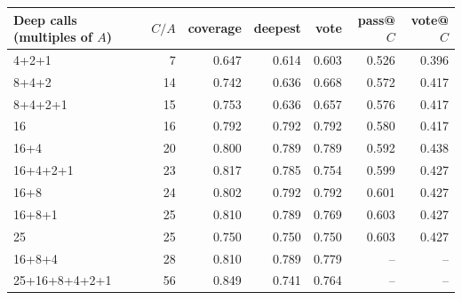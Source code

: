 \begin{tabular}{lrrrrrr}
\toprule
Deep calls (multiples of $A$) & $C/A$ & coverage & deepest & vote & pass@$C$ & vote@$C$ \\ \midrule
4+2+1 & 7 & 0.647 & 0.614 & 0.603 & 0.526 & 0.396 \\
8+4+2 & 14 & 0.742 & 0.636 & 0.668 & 0.572 & 0.417 \\
8+4+2+1 & 15 & 0.753 & 0.636 & 0.657 & 0.576 & 0.417 \\
16 & 16 & 0.792 & 0.792 & 0.792 & 0.580 & 0.417 \\
16+4 & 20 & 0.800 & 0.789 & 0.789 & 0.592 & 0.438 \\
16+4+2+1 & 23 & 0.817 & 0.785 & 0.754 & 0.599 & 0.427 \\
16+8 & 24 & 0.802 & 0.792 & 0.792 & 0.601 & 0.427 \\
16+8+1 & 25 & 0.810 & 0.789 & 0.769 & 0.603 & 0.427 \\
25 & 25 & 0.750 & 0.750 & 0.750 & 0.603 & 0.427 \\
16+8+4 & 28 & 0.810 & 0.789 & 0.779 & -- & -- \\
25+16+8+4+2+1 & 56 & 0.849 & 0.741 & 0.764 & -- & -- \\
\bottomrule
\end{tabular}

